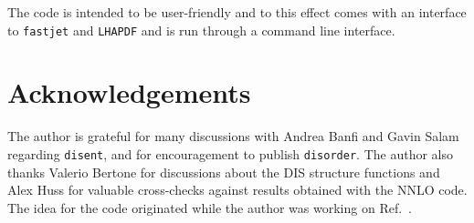 \documentclass[submission, PhysCodeb]{SciPost_better_arXiv}
\newcommand{\disent}{{\tt disent}}
\newcommand{\disorder}{{\tt disorder}}
\newcommand{\fastjet}{{\tt fastjet}}
\newcommand{\lhapdf}{{\tt LHAPDF}}
\newcommand{\nnlojet}{NNLO{\sc{jet}}}
\begin{document}
The code is intended to be user-friendly and to this effect comes with
an interface to \fastjet{} and \lhapdf{} and is run through a
command line interface. 

\section*{Acknowledgements}
The author is grateful for many discussions with Andrea Banfi and
Gavin Salam regarding \disent{}, and for encouragement to publish
\disorder{}. The author also thanks Valerio Bertone for discussions
about the DIS structure functions and Alex Huss for valuable cross-checks
against results obtained with the \nnlojet{} code. The idea for the
code originated while the author was working on
Ref.~\cite{Banfi:2023mhz}.


%
%



\nolinenumbers
\end{document}
